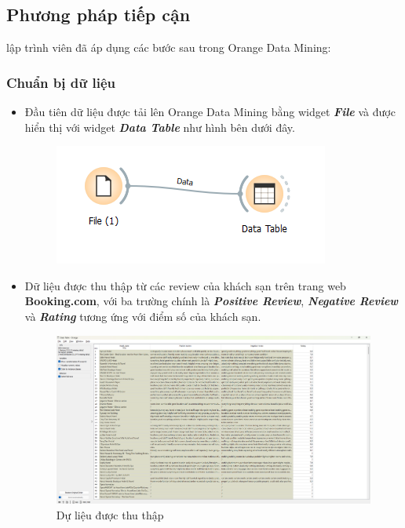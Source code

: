 \subsection{Phương pháp tiếp cận}
lập trình viên đã áp dụng các bước sau trong Orange Data Mining:

\subsubsection{Chuẩn bị dữ liệu}
\begin{itemize}
    \item Đầu tiên dữ liệu được tải lên Orange Data Mining bằng widget \textbf{\textit{File}} và được hiển thị với widget \textbf{\textit{Data Table}} như hình bên dưới đây.

    \begin{figure}[H]
        \centering
        \includegraphics[width=0.5\linewidth]{Figures/10.1.png}
        \label{fig:enter-label}
    \end{figure}

    \item Dữ liệu được thu thập từ các review của khách sạn trên trang web \textbf{Booking.com}, với ba trường chính là \textbf{\textit{Positive Review}}, \textbf{\textit{Negative Review}} và \textbf{\textit{Rating}} tương ứng với điểm số của khách sạn. 

    \begin{figure}[H]
        \centering
        \includegraphics[width=1.0\linewidth]{Figures/10.2.png}
        \caption{Dự liệu được thu thập}
        \label{fig:enter-label}
    \end{figure}


\end{itemize}
